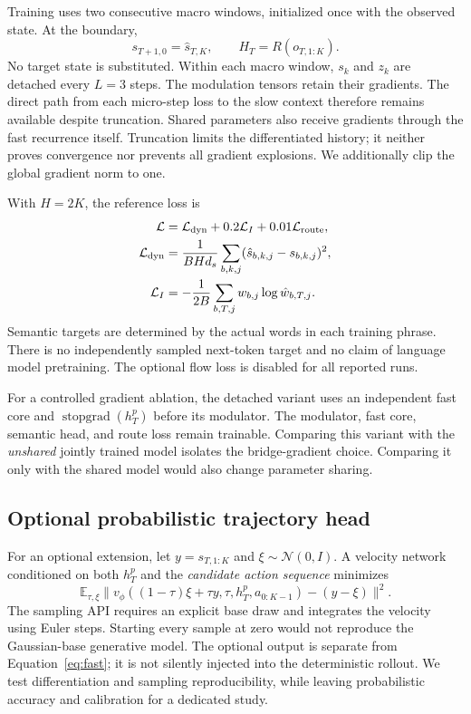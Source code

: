 \documentclass[10pt,twocolumn]{article}
\newcommand{\E}{\mathbb{E}}
\newcommand{\sg}{\operatorname{stopgrad}}
\begin{document}
Training uses two consecutive macro windows, initialized once with the observed
state. At the boundary,
\begin{equation}
 s_{T+1,0}=\hat s_{T,K},\qquad
 H_T=R(o_{T,1:K}).
\end{equation}
No target state is substituted. Within each macro window, $s_k$ and $z_k$ are
detached every $L=3$ steps. The modulation tensors retain their gradients.
The direct path from each micro-step loss to the slow context therefore remains
available despite truncation. Shared parameters also receive gradients through
the fast recurrence itself. Truncation limits the differentiated history; it
neither proves convergence nor prevents all gradient explosions. We additionally
clip the global gradient norm to one.

With $H=2K$, the reference loss is
\begin{align}
 \mathcal L&=\mathcal L_{\rm dyn}+0.2\mathcal L_I+0.01\mathcal L_{\rm route},\\
 \mathcal L_{\rm dyn}&=\frac{1}{BHd_s}\sum_{b,k,j}
    (\hat s_{b,k,j}-s_{b,k,j})^2,\\
 \mathcal L_I&=-\frac{1}{2B}\sum_{b,T,j}w_{b,j}\log\hat w_{b,T,j}.
\end{align}
Semantic targets are determined by the actual words in each training phrase.
There is no independently sampled next-token target and no claim of language
model pretraining. The optional flow loss is disabled for all reported runs.

For a controlled gradient ablation, the detached variant uses an independent
fast core and $\sg(h_T^p)$ before its modulator. The modulator, fast core,
semantic head, and route loss remain trainable. Comparing this variant with
the \emph{unshared} jointly trained model isolates the bridge-gradient choice.
Comparing it only with the shared model would also change parameter sharing.

\subsection{Optional probabilistic trajectory head}
For an optional extension, let $y=s_{T,1:K}$ and
$\xi\sim\mathcal N(0,I)$. A velocity network conditioned on both $h_T^p$ and the
\emph{candidate action sequence} minimizes
\begin{equation}
 \E_{\tau,\xi}\big\|v_\phi((1-\tau)\xi+\tau y,\tau,h_T^p,a_{0:K-1})
                         -(y-\xi)\big\|^2.
\end{equation}
The sampling API requires an explicit base draw and integrates the velocity
using Euler steps. Starting every sample at zero would not reproduce the
Gaussian-base generative model. The optional output is separate from
Equation~\eqref{eq:fast}; it is not silently injected into the deterministic
rollout. We test differentiation and sampling reproducibility, while leaving
probabilistic accuracy and calibration for a dedicated study.
\end{document}
